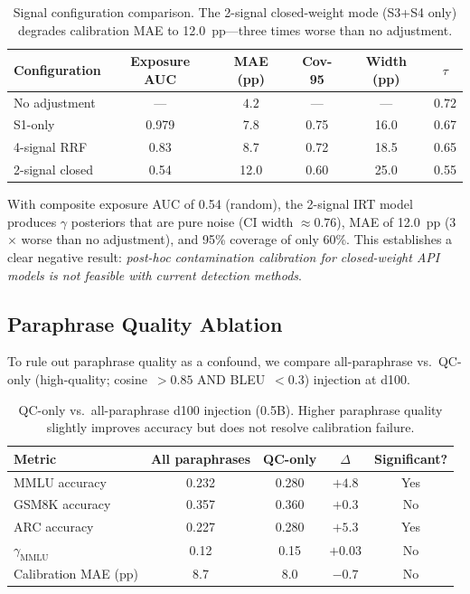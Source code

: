 \documentclass[11pt]{article}
\begin{document}
\begin{table}[t]
\centering
\caption{Signal configuration comparison.
The 2-signal closed-weight mode (S3+S4 only) degrades calibration MAE to 12.0~pp---three times worse than no adjustment.}
\label{tab:closed}
\small
\begin{tabular}{lccccc}
\toprule
Configuration & Exposure AUC & MAE (pp) & Cov-95 & Width (pp) & $\tau$ \\
\midrule
No adjustment & --- & $\mathbf{4.2}$ & --- & --- & $\mathbf{0.72}$ \\
S1-only & 0.979 & 7.8 & 0.75 & 16.0 & 0.67 \\
4-signal RRF & 0.83 & 8.7 & 0.72 & 18.5 & 0.65 \\
2-signal closed & 0.54 & 12.0 & 0.60 & 25.0 & 0.55 \\
\bottomrule
\end{tabular}
\end{table}

With composite exposure AUC of 0.54 (random), the 2-signal IRT model produces $\gamma$ posteriors that are pure noise (CI width $\approx 0.76$), MAE of 12.0~pp (3$\times$ worse than no adjustment), and 95\% coverage of only 60\%.
This establishes a clear negative result: \emph{post-hoc contamination calibration for closed-weight API models is not feasible with current detection methods}.

\subsection{Paraphrase Quality Ablation}
\label{sec:qc}

To rule out paraphrase quality as a confound, we compare all-paraphrase vs.\ QC-only (high-quality; cosine~$> 0.85$ AND BLEU~$< 0.3$) injection at d100.

\begin{table}[t]
\centering
\caption{QC-only vs.\ all-paraphrase d100 injection (0.5B).
Higher paraphrase quality slightly improves accuracy but does not resolve calibration failure.}
\label{tab:qc}
\small
\begin{tabular}{lcccc}
\toprule
Metric & All paraphrases & QC-only & $\Delta$ & Significant? \\
\midrule
MMLU accuracy & 0.232 & 0.280 & $+4.8$ & Yes \\
GSM8K accuracy & 0.357 & 0.360 & $+0.3$ & No \\
ARC accuracy & 0.227 & 0.280 & $+5.3$ & Yes \\
$\gamma_{\text{MMLU}}$ & 0.12 & 0.15 & $+0.03$ & No \\
Calibration MAE (pp) & 8.7 & 8.0 & $-0.7$ & No \\
\bottomrule
\end{tabular}
\end{table}
\end{document}
